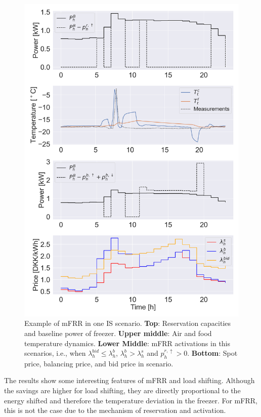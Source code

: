 \begin{figure}[!t]
    \centering
    \includegraphics[width=\columnwidth]{../figures/mFRR_single_case.png}
    \caption{Example of mFRR in one IS scenario. \textbf{Top}: Reservation capacities and baseline power of freezer. \textbf{Upper middle}: Air and food temperature dynamics. \textbf{Lower Middle}: mFRR activations in this scenarios, i.e., when $\lambda_{h}^{bid} \leq \lambda_{h}^{b}$, $\lambda_{h}^{b} > \lambda_{h}^{s}$ and $p^{r,\uparrow}_{h} > 0$. \textbf{Bottom}: Spot price, balancing price, and bid price in scenario.}
    \label{fig:fig_second_case}
\end{figure}

The results show some interesting features of mFRR and load shifting. Although the savings are higher for load shifting, they are directly proportional to the energy shifted and therefore the temperature deviation in the freezer. For mFRR, this is not the case due to the mechanism of reservation and activation.

